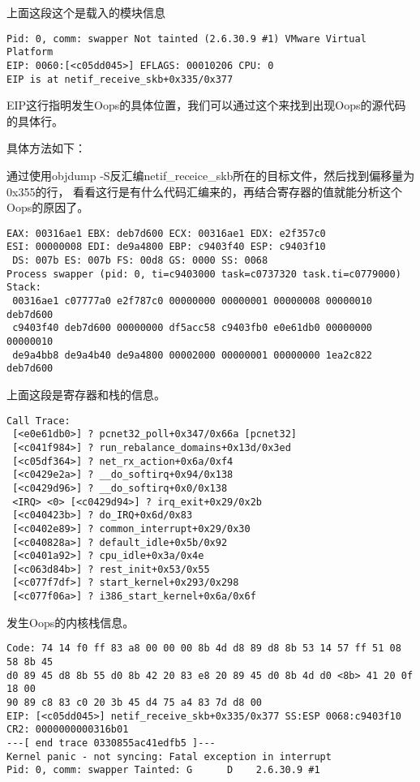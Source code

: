 上面这段这个是载入的模块信息

\begin{lstlisting}
Pid: 0, comm: swapper Not tainted (2.6.30.9 #1) VMware Virtual Platform
EIP: 0060:[<c05dd045>] EFLAGS: 00010206 CPU: 0
EIP is at netif_receive_skb+0x335/0x377
\end{lstlisting}

EIP这行指明发生Oops的具体位置，我们可以通过这个来找到出现Oops的源代码的具体行。

具体方法如下：

通过使用objdump -S反汇编netif\_receice\_skb所在的目标文件，然后找到偏移量为0x355的行，
看看这行是有什么代码汇编来的，再结合寄存器的值就能分析这个Oops的原因了。

 

\begin{lstlisting}
EAX: 00316ae1 EBX: deb7d600 ECX: 00316ae1 EDX: e2f357c0
ESI: 00000008 EDI: de9a4800 EBP: c9403f40 ESP: c9403f10
 DS: 007b ES: 007b FS: 00d8 GS: 0000 SS: 0068
Process swapper (pid: 0, ti=c9403000 task=c0737320 task.ti=c0779000)
Stack:
 00316ae1 c07777a0 e2f787c0 00000000 00000001 00000008 00000010 deb7d600
 c9403f40 deb7d600 00000000 df5acc58 c9403fb0 e0e61db0 00000000 00000010
 de9a4bb8 de9a4b40 de9a4800 00002000 00000001 00000000 1ea2c822 deb7d600
\end{lstlisting}

上面这段是寄存器和栈的信息。

 

\begin{lstlisting}
Call Trace:
 [<e0e61db0>] ? pcnet32_poll+0x347/0x66a [pcnet32]
 [<c041f984>] ? run_rebalance_domains+0x13d/0x3ed
 [<c05df364>] ? net_rx_action+0x6a/0xf4
 [<c0429e2a>] ? __do_softirq+0x94/0x138
 [<c0429d96>] ? __do_softirq+0x0/0x138
 <IRQ> <0> [<c0429d94>] ? irq_exit+0x29/0x2b
 [<c040423b>] ? do_IRQ+0x6d/0x83
 [<c0402e89>] ? common_interrupt+0x29/0x30
 [<c040828a>] ? default_idle+0x5b/0x92
 [<c0401a92>] ? cpu_idle+0x3a/0x4e
 [<c063d84b>] ? rest_init+0x53/0x55
 [<c077f7df>] ? start_kernel+0x293/0x298
 [<c077f06a>] ? i386_start_kernel+0x6a/0x6f
\end{lstlisting}

发生Oops的内核栈信息。

 

\begin{lstlisting}
Code: 74 14 f0 ff 83 a8 00 00 00 8b 4d d8 89 d8 8b 53 14 57 ff 51 08 58 8b 45 
d0 89 45 d8 8b 55 d0 8b 42 20 83 e8 20 89 45 d0 8b 4d d0 <8b> 41 20 0f 18 00 
90 89 c8 83 c0 20 3b 45 d4 75 a4 83 7d d8 00
EIP: [<c05dd045>] netif_receive_skb+0x335/0x377 SS:ESP 0068:c9403f10
CR2: 0000000000316b01
---[ end trace 0330855ac41edfb5 ]---
Kernel panic - not syncing: Fatal exception in interrupt
Pid: 0, comm: swapper Tainted: G      D    2.6.30.9 #1
\end{lstlisting}

